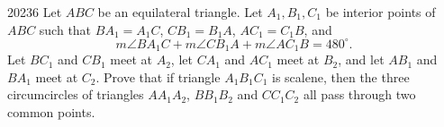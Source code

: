 \begin{problem}{2023}{6}
Let $ABC$ be an equilateral triangle. Let $A_1, B_1, C_1$ be interior points of $ABC$ such that $BA_1=A_1C$, $CB_1=B_1A$, $AC_1=C_1B$, and
\[
    m\angle BA_1C+m\angle CB_1A+m\angle AC_1B=480^\circ.
\]
Let $BC_1$ and $CB_1$ meet at $A_2$, let $CA_1$ and $AC_1$ meet at $B_2$, and let $AB_1$ and $BA_1$ meet at $C_2$. Prove that if triangle $A_1B_1C_1$ is scalene, then the three circumcircles of triangles $AA_1A_2$, $BB_1B_2$ and $CC_1C_2$ all pass through two common points.
\end{problem}
